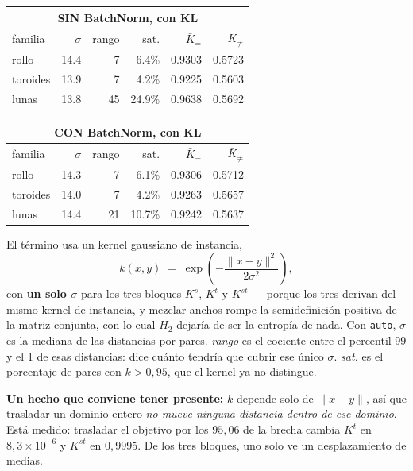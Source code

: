 \documentclass[11pt,a4paper]{article}
\begin{document}
\noindent
\begin{minipage}[t]{0.49\textwidth}
  \centering
  \footnotesize\setlength{\tabcolsep}{3pt}
  \begin{tabular}{lrrrrr}
      \multicolumn{6}{c}{\textbf{SIN BatchNorm, con KL}} \\[2pt]
      \toprule
      familia & $\sigma$ & rango & sat. & $\bar K_{=}$ & $\bar K_{\neq}$ \\
      \midrule
      rollo & 14.4 & 7 & 6.4\% & 0.9303 & 0.5723 \\
      toroides & 13.9 & 7 & 4.2\% & 0.9225 & 0.5603 \\
      lunas & 13.8 & 45 & 24.9\% & 0.9638 & 0.5692 \\
      \bottomrule
    \end{tabular}
\end{minipage}\hfill
\begin{minipage}[t]{0.49\textwidth}
  \centering
  \footnotesize\setlength{\tabcolsep}{3pt}
  \begin{tabular}{lrrrrr}
      \multicolumn{6}{c}{\textbf{CON BatchNorm, con KL}} \\[2pt]
      \toprule
      familia & $\sigma$ & rango & sat. & $\bar K_{=}$ & $\bar K_{\neq}$ \\
      \midrule
      rollo & 14.3 & 7 & 6.1\% & 0.9306 & 0.5712 \\
      toroides & 14.0 & 7 & 4.2\% & 0.9263 & 0.5657 \\
      lunas & 14.4 & 21 & 10.7\% & 0.9242 & 0.5637 \\
      \bottomrule
    \end{tabular}
\end{minipage}
\vspace{11pt}


El término usa un kernel gaussiano de instancia,
\[
  k(x,y) \;=\; \exp\!\left(-\frac{\lVert x - y\rVert^2}{2\sigma^2}\right),
\]
con \textbf{un solo $\sigma$} para los tres bloques $K^s$, $K^t$ y $K^{st}$ ---
porque los tres derivan del mismo kernel de instancia, y mezclar anchos rompe la
semidefinición positiva de la matriz conjunta, con lo cual $H_2$ dejaría de ser la
entropía de nada. Con \texttt{auto}, $\sigma$ es la mediana de las distancias por
pares. \textit{rango} es el cociente entre el percentil 99 y el 1 de esas
distancias: dice cuánto tendría que cubrir ese único $\sigma$. \textit{sat.} es el
porcentaje de pares con $k > 0{,}95$, que el kernel ya no distingue.

\textbf{Un hecho que conviene tener presente:} $k$ depende solo de $\lVert x-y
\rVert$, así que trasladar un dominio entero \emph{no mueve ninguna distancia
dentro de ese dominio}. Está medido: trasladar el objetivo por los $95{,}06$ de la
brecha cambia $K^t$ en $8{,}3 \times 10^{-6}$ y $K^{st}$ en $0{,}9995$. De los tres
bloques, uno solo ve un desplazamiento de medias.
\end{document}
